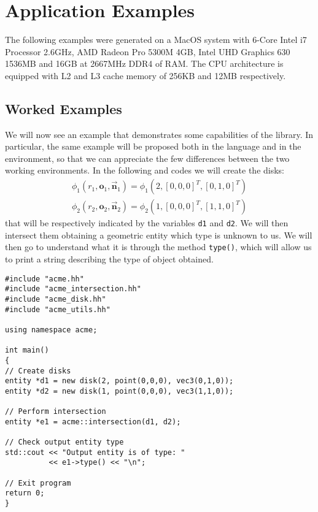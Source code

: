 
\section{Application Examples}
\label{example}

The following examples were generated on a MacOS system with 6-Core Intel i7 Processor 2.6GHz, AMD Radeon Pro 5300M 4GB, Intel UHD Graphics 630 1536MB and 16GB at 2667MHz DDR4 of RAM. The CPU architecture is equipped with L2 and L3 cache memory of 256KB and 12MB respectively.

\subsection{Worked Examples}
We will now see an example that demonstrates some capabilities of the \Acme{} library. In particular, the same example will be proposed both in the \cpp{} language and in the \Matlab{} environment, so that we can appreciate the few differences between the two working environments. In the following \cpp{} and \Matlab{} codes we will create the disks:
%
\begin{equation*}
\begin{split}
\phi_1(r_1, \boldsymbol{o}_1, \vec{\boldsymbol{n}}_1) = \phi_1(2,\left[0,0,0\right]^T, \left[0,1,0\right]^T) \\
\phi_2(r_2, \boldsymbol{o}_2, \vec{\boldsymbol{n}}_2) = \phi_2(1,\left[0,0,0\right]^T, \left[1,1,0\right]^T)
\end{split}
\end{equation*}
%
that will be respectively indicated by the variables \texttt{d1} and \texttt{d2}. We will then intersect them obtaining a geometric entity which type is unknown to us. We will then go to understand what it is through the method \texttt{type()}, which will allow us to print a string describing the type of object obtained.

\cpp{}
\begin{verbatim}
#include "acme.hh"
#include "acme_intersection.hh"
#include "acme_disk.hh"
#include "acme_utils.hh"

using namespace acme;

int main()
{
// Create disks
entity *d1 = new disk(2, point(0,0,0), vec3(0,1,0));
entity *d2 = new disk(1, point(0,0,0), vec3(1,1,0));

// Perform intersection
entity *e1 = acme::intersection(d1, d2);

// Check output entity type
std::cout << "Output entity is of type: "
          << e1->type() << "\n";

// Exit program
return 0;
}
\end{verbatim}

